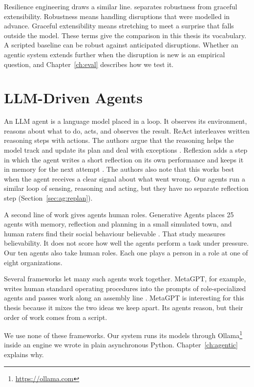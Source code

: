 Resilience engineering draws a similar line. \textcite{woods2015a} separates
robustness from graceful extensibility. Robustness means handling
disruptions that were modelled in advance. Graceful extensibility means
stretching to meet a surprise that falls outside the model. These terms give
the comparison in this thesis its vocabulary. A scripted baseline can be robust
against anticipated disruptions. Whether an agentic system extends further when
the disruption is new is an empirical question, and Chapter~\ref{ch:eval}
describes how we test it.

\section{LLM-Driven Agents}
\label{sec:bg:agentic}

An LLM agent is a language model placed in a loop. It observes its
environment, reasons about what to do, acts, and observes the result. ReAct
interleaves written reasoning steps with actions. The authors argue that the
reasoning helps the model track and update its plan and deal with exceptions
\parencite{yao2023}. Reflexion adds a step in which the agent writes a short
reflection on its own performance and keeps it in memory for the next attempt
\parencite{shinn2023}. The authors also note that this works best when the
agent receives a clear signal about what went wrong. Our agents run a similar
loop of sensing, reasoning and acting, but they have no separate reflection
step (Section~\ref{sec:ag:replan}).

A second line of work gives agents human roles. Generative Agents places 25
agents with memory, reflection and planning in a small simulated town, and
human raters find their social behaviour believable \parencite{park2023}. That
study measures believability. It does not score how well the agents perform a
task under pressure. Our ten agents also take human roles. Each one plays a person in a role at one of eight
organizations.

Several frameworks let many such agents work together. MetaGPT, for example, writes human
standard operating procedures into the prompts of role-specialized agents and
passes work along an assembly line \parencite{hong2024}. MetaGPT is
interesting for this thesis because it mixes the two ideas we keep apart. Its
agents reason, but their order of work comes from a script.

We use none of these frameworks. Our system runs its models through
Ollama\footnote{\url{https://ollama.com}} inside an engine we wrote in plain asynchronous Python.
Chapter~\ref{ch:agentic} explains why.


